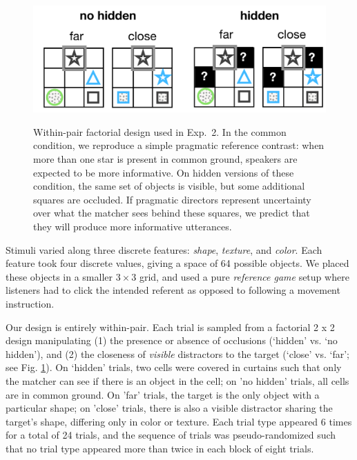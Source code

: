 \documentclass[manuscript]{stjour}
\begin{document}
  \begin{figure}[t!]
 \begin{center}
 \vspace{-.5cm}
 \includegraphics[scale=.35]{figures/Exp2_design.pdf}
 \caption{Within-pair factorial design used in Exp.~2. In the common condition, we reproduce a simple pragmatic reference contrast: when more than one star is present in common ground, speakers are expected to be more informative. On hidden versions of these condition, the same set of objects is visible, but some additional squares are occluded. If pragmatic directors represent uncertainty over what the matcher sees behind these squares, we predict that they will produce more informative utterances. }
 \vspace{-.5cm}
 \label{fig:exp2design}
 \end{center}
 \end{figure}
 
Stimuli varied along three discrete features: \emph{shape}, \emph{texture}, and \emph{color}. Each feature took four discrete values, giving a space of 64 possible objects. We placed these objects in a smaller $3 \times 3$ grid, and used a pure \emph{reference game} setup where listeners had to click the intended referent as opposed to following a movement instruction. 

Our design is entirely within-pair. Each trial is sampled from a factorial 2 x 2 design manipulating (1) the presence or absence of occlusions (`hidden' vs. `no hidden'), and (2) the closeness of \emph{visible} distractors to the target (`close' vs. `far'; see Fig. \ref{fig:exp2design}). On `hidden' trials, two cells were covered in curtains such that only the matcher can see if there is an object in the cell; on 'no hidden' trials, all cells are in common ground. On 'far' trials, the target is the only object with a particular shape; on 'close' trials, there is also a visible distractor sharing the target's shape, differing only in color or texture. Each trial type appeared 6 times for a total of 24 trials, and the sequence of trials was pseudo-randomized such that no trial type appeared more than twice in each block of eight trials. 
\end{document}
